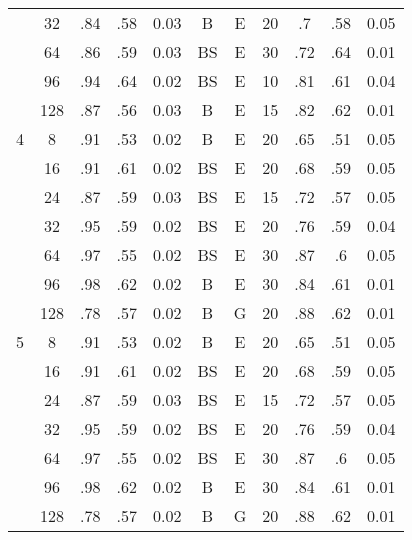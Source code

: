 \begin{table}
\begin{tabular}{|c|c|cccccc||ccc|}
  &  32 &   .84 &  .58 &     0.03 &       B &         E & 20 &    .7 &  .58 & 0.05 \\
  &  64 &   .86 &  .59 &     0.03 &      BS &         E & 30 &   .72 &  .64 & 0.01 \\
  &  96 &   .94 &  .64 &     0.02 &      BS &         E & 10 &   .81 &  .61 & 0.04 \\
  & 128 &   .87 &  .56 &     0.03 &       B &         E & 15 &   .82 &  .62 & 0.01 \\\hline
4 &   8 &   .91 &  .53 &     0.02 &       B &         E & 20 &   .65 &  .51 & 0.05 \\
  &  16 &   .91 &  .61 &     0.02 &      BS &         E & 20 &   .68 &  .59 & 0.05 \\
  &  24 &   .87 &  .59 &     0.03 &      BS &         E & 15 &   .72 &  .57 & 0.05 \\
  &  32 &   .95 &  .59 &     0.02 &      BS &         E & 20 &   .76 &  .59 & 0.04 \\
  &  64 &   .97 &  .55 &     0.02 &      BS &         E & 30 &   .87 &   .6 & 0.05 \\
  &  96 &   .98 &  .62 &     0.02 &       B &         E & 30 &   .84 &  .61 & 0.01 \\
  & 128 &   .78 &  .57 &     0.02 &       B &         G & 20 &   .88 &  .62 & 0.01 \\\hline
5 &   8 &   .91 &  .53 &     0.02 &       B &         E & 20 &   .65 &  .51 & 0.05 \\
  &  16 &   .91 &  .61 &     0.02 &      BS &         E & 20 &   .68 &  .59 & 0.05 \\
  &  24 &   .87 &  .59 &     0.03 &      BS &         E & 15 &   .72 &  .57 & 0.05 \\
  &  32 &   .95 &  .59 &     0.02 &      BS &         E & 20 &   .76 &  .59 & 0.04 \\
  &  64 &   .97 &  .55 &     0.02 &      BS &         E & 30 &   .87 &   .6 & 0.05 \\
  &  96 &   .98 &  .62 &     0.02 &       B &         E & 30 &   .84 &  .61 & 0.01 \\
  & 128 &   .78 &  .57 &     0.02 &       B &         G & 20 &   .88 &  .62 & 0.01 \\\hline
\end{tabular}
\end{table}
